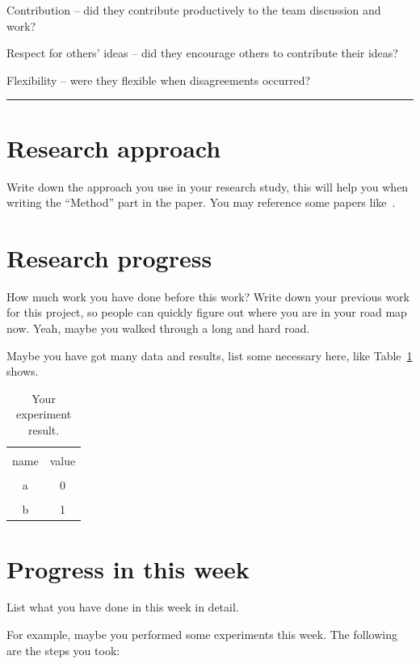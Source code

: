 \documentclass[a4paper]{article}
\begin{document}
Contribution – did they contribute productively to the team discussion and work?

Respect for others’ ideas – did they encourage others to contribute their ideas?

Flexibility – were they flexible when disagreements occurred?
\vspace{2cm}
\hrule

\section{Research approach}

Write down the approach you use in your research study, this will help you when writing the ``Method'' part in the paper. You may reference some papers like~\cite{isola2017image}.


\section{Research progress}

How much work you have done before this work? Write down your previous work for this project, so people can quickly figure out where you are in your road map now. Yeah, maybe you walked through a long and hard road.

Maybe you have got many data and results, list some necessary here, like Table~\ref{tab:result} shows.

\begin{table}[hb]
    \centering
    \begin{tabular}{c|c}
        \hline \\
        name & value \\
        \hline \\
        a & 0 \\
        \hline \\
        b & 1 \\
        \hline
    \end{tabular}
    \caption{Your experiment result.}
    \label{tab:result}
\end{table}


\section{Progress in this week}

List what you have done in this week in detail.

For example, maybe you performed some experiments this week. The following are the steps you took:
\end{document}

